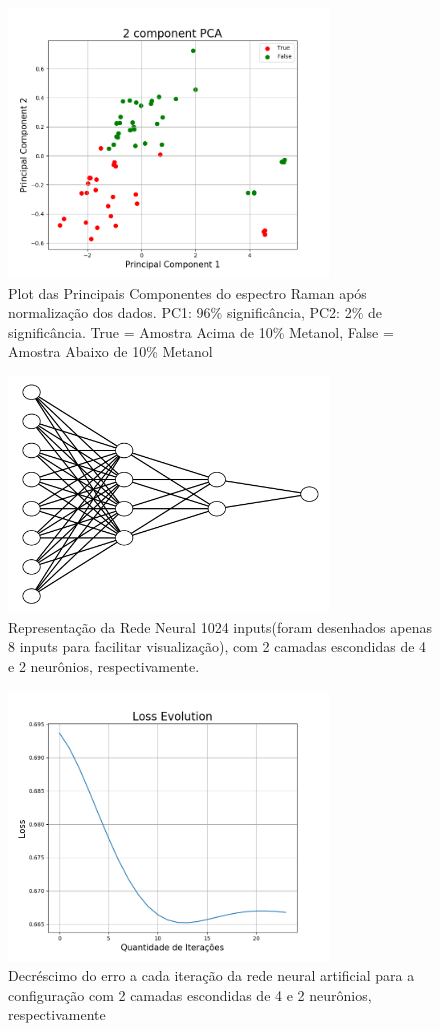 \documentclass{article}
\begin{document}
\begin{figure}[ht]
\centering
\includegraphics[width=8.5cm]{pca}
\caption{Plot das Principais Componentes do espectro Raman após normalização dos dados. PC1: 96\% significância, PC2: 2\% de significância. True = Amostra Acima de 10\% Metanol, False = Amostra Abaixo de 10\% Metanol}
\label{pca}
\end{figure}

\begin{figure}[ht]
\centering
\includegraphics[width=8.5cm]{rna_4_2}
\caption{Representação da Rede Neural 1024 inputs(foram desenhados apenas 8 inputs para facilitar visualização), com 2 camadas escondidas de 4 e 2 neurônios, respectivamente.}
\label{rna_4_2}
\end{figure}

\begin{figure}[ht]
\centering
\includegraphics[width=8.5cm]{rna_4_2_loss}
\caption{Decréscimo do erro a cada iteração da rede neural artificial para a configuração com 2 camadas escondidas de 4 e 2 neurônios, respectivamente}
\label{rna_4_2_loss}
\end{figure}
\end{document}
